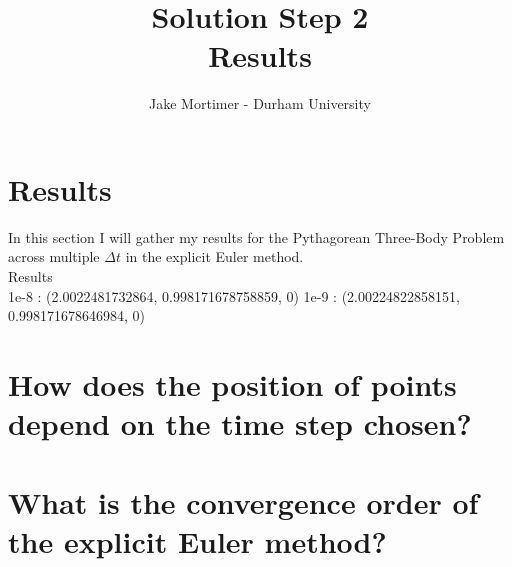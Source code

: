 \documentclass{article}
\title{Solution Step 2 \\ Results}
\author{Jake Mortimer - Durham University}
\begin{document}
\maketitle
\section{Results}
In this section I will gather my results for the Pythagorean Three-Body Problem across multiple $\Delta t$ in the explicit Euler method. \\
Results\\
1e-8 : (2.0022481732864, 0.998171678758859, 0)
1e-9 : (2.00224822858151, 0.998171678646984, 0)

\section{How does the position of points depend on the time step chosen?}

\section{What is the convergence order of the explicit Euler method?}
\end{document}
